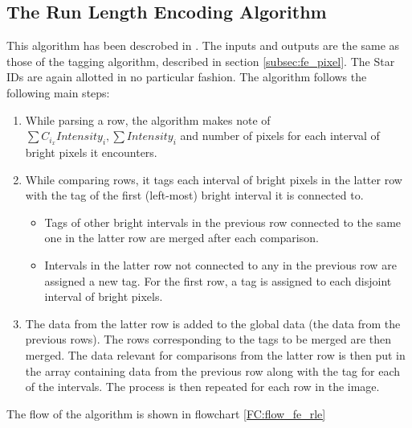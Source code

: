 \documentclass[../../main.tex]{subfiles}
\begin{document}
\subsection{The Run Length Encoding Algorithm}
This algorithm has been descrobed in \cite{fe_blob_detection}. The inputs and outputs are the same as those of the tagging algorithm, described in section \ref{subsec:fe_pixel}. The Star IDs are again allotted in no particular fashion. The algorithm follows the following main steps:
\begin{enumerate}
    \item While parsing a row, the algorithm makes note of $\sum C_{i_{x}}Intensity_{i}, \sum Intensity_{i} $ and number of pixels for each interval of bright pixels it encounters.
    \item While comparing rows, it tags each interval of bright pixels in the latter row with the tag of the first (left-most) bright interval it is connected to.
    \begin{itemize}
        \item Tags of other bright intervals in the previous row connected to the same one in the latter row are merged after each comparison.
        \item Intervals in the latter row not connected to any in the previous row are assigned a new tag. For the first row, a tag is assigned to each disjoint interval of bright pixels.
    \end{itemize}
    \item The data from the latter row is added to the global data (the data from the previous rows). The rows corresponding to the tags to be merged are then merged. The data relevant for comparisons from the latter row is then put in the array containing data from the previous row along with the tag for each of the intervals. The process is then repeated for each row in the image.
\end{enumerate}
The flow of the algorithm is shown in flowchart \ref{FC:flow_fe_rle}
\end{document}
